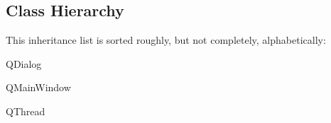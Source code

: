 \subsection{Class Hierarchy}
This inheritance list is sorted roughly, but not completely, alphabetically\+:\begin{DoxyCompactList}
\item {}
\item {}
\item {}
\item {}
\item Q\+Dialog\begin{DoxyCompactList}
\item {}
\end{DoxyCompactList}
\item Q\+Main\+Window\begin{DoxyCompactList}
\item {}
\end{DoxyCompactList}
\item Q\+Thread\begin{DoxyCompactList}
\item {}
\item {}
\end{DoxyCompactList}
\item {}
\end{DoxyCompactList}
